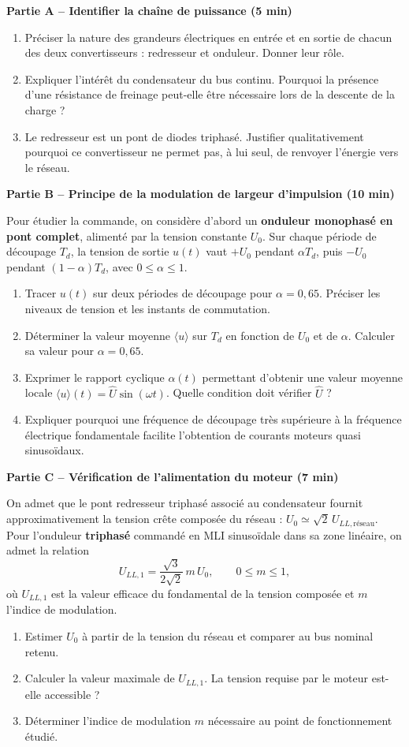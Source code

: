 \documentclass[11pt,a4paper]{article}
\newcommand{\partie}[1]{\vspace{0.7em}\noindent\textbf{\large #1}\par\vspace{0.25em}}
\begin{document}
\partie{Partie A -- Identifier la chaîne de puissance (5 min)}
\begin{enumerate}[label=\textbf{A\arabic*.}]
\item Préciser la nature des grandeurs électriques en entrée et en sortie de chacun des deux convertisseurs : redresseur et onduleur. Donner leur rôle.
\item Expliquer l'intérêt du condensateur du bus continu. Pourquoi la présence d'une résistance de freinage peut-elle être nécessaire lors de la descente de la charge ?
\item Le redresseur est un pont de diodes triphasé. Justifier qualitativement pourquoi ce convertisseur ne permet pas, à lui seul, de renvoyer l'énergie vers le réseau.
\end{enumerate}

\partie{Partie B -- Principe de la modulation de largeur d'impulsion (10 min)}
Pour étudier la commande, on considère d'abord un \textbf{onduleur monophasé en pont complet}, alimenté par la tension constante $U_0$. Sur chaque période de découpage $T_d$, la tension de sortie $u(t)$ vaut $+U_0$ pendant $\alpha T_d$, puis $-U_0$ pendant $(1-\alpha)T_d$, avec $0\leq\alpha\leq1$.
\begin{enumerate}[label=\textbf{B\arabic*.}]
\item Tracer $u(t)$ sur deux périodes de découpage pour $\alpha=0{,}65$. Préciser les niveaux de tension et les instants de commutation.
\item Déterminer la valeur moyenne $\langle u\rangle$ sur $T_d$ en fonction de $U_0$ et de $\alpha$. Calculer sa valeur pour $\alpha=0{,}65$.
\item Exprimer le rapport cyclique $\alpha(t)$ permettant d'obtenir une valeur moyenne locale $\langle u\rangle(t)=\widehat U\sin(\omega t)$. Quelle condition doit vérifier $\widehat U$ ?
\item Expliquer pourquoi une fréquence de découpage très supérieure à la fréquence électrique fondamentale facilite l'obtention de courants moteurs quasi sinusoïdaux.
\end{enumerate}

\newpage
\partie{Partie C -- Vérification de l'alimentation du moteur (7 min)}
On admet que le pont redresseur triphasé associé au condensateur fournit approximativement la tension crête composée du réseau : $U_0\simeq\sqrt{2}\,U_{LL,\mathrm{réseau}}$. Pour l'onduleur \textbf{triphasé} commandé en MLI sinusoïdale dans sa zone linéaire, on admet la relation
\[
U_{LL,1}=\frac{\sqrt{3}}{2\sqrt{2}}\,m\,U_0,\qquad 0\leq m\leq1,
\]
où $U_{LL,1}$ est la valeur efficace du fondamental de la tension composée et $m$ l'indice de modulation.
\begin{enumerate}[label=\textbf{C\arabic*.}]
\item Estimer $U_0$ à partir de la tension du réseau et comparer au bus nominal retenu.
\item Calculer la valeur maximale de $U_{LL,1}$. La tension requise par le moteur est-elle accessible ?
\item Déterminer l'indice de modulation $m$ nécessaire au point de fonctionnement étudié.
\end{enumerate}
\end{document}
